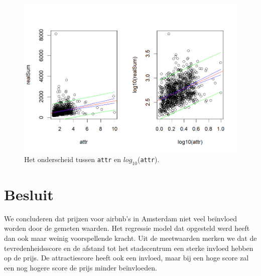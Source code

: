 \documentclass[a4paper]{kulakarticle}
\begin{document}
	\begin{figure}
		\centering
		\includegraphics[width=0.9\linewidth]{Figuren/betr.attr}
		\cprotect\caption{Het onderscheid tussen \verb*|attr| en $log_{10}$(\verb*|attr|).}
		\label{fig:betr}
	\end{figure}
	
	\section*{Besluit}
	We concluderen dat prijzen voor airbnb's in Amsterdam niet veel beïnvloed worden door de gemeten waarden. Het regressie model dat opgesteld werd heeft dan ook maar weinig voorspellende kracht.
	Uit de meetwaarden merken we dat de tevredenheidsscore en de afstand tot het stadscentrum een sterke invloed hebben op de prijs. De attractiescore heeft ook een invloed, maar bij een hoge score zal een nog hogere score de prijs minder beïnvloeden.
	
\end{document}

